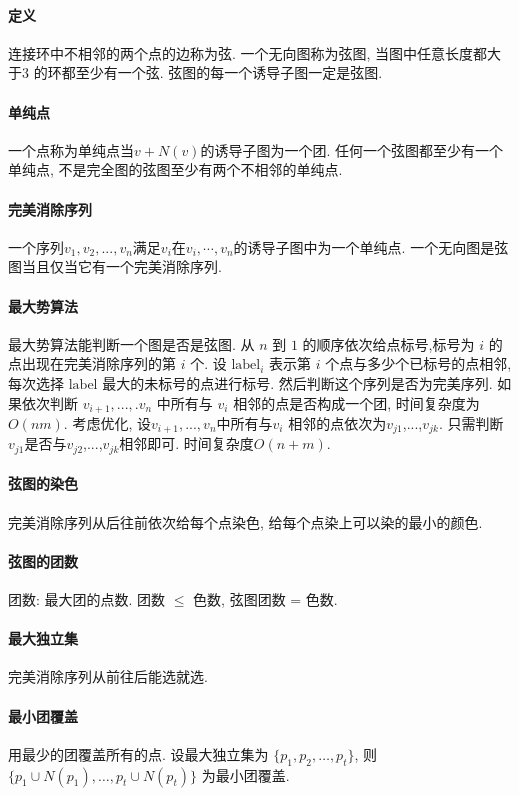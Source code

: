 \paragraph{定义}连接环中不相邻的两个点的边称为弦. 一个无向图称为弦图, 当图中任意长度都大于$3$ 的环都至少有一个弦. 弦图的每一个诱导子图一定是弦图. 
\paragraph{单纯点}一个点称为单纯点当${v}+N(v)$的诱导子图为一个团. 任何一个弦图都至少有一个单纯点, 不是完全图的弦图至少有两个不相邻的单纯点. 
\paragraph{完美消除序列}一个序列${v_1,v_2,...,v_n}$满足$v_i$在${v_i,\cdots,v_n}$的诱导子图中为一个单纯点. 一个无向图是弦图当且仅当它有一个完美消除序列.
\paragraph{最大势算法}最大势算法能判断一个图是否是弦图. 从 $n$ 到 $1$ 的顺序依次给点标号,标号为 $i$ 的点出现在完美消除序列的第 $i$ 个.
设 $\mathrm{label}_i$ 表示第 $i$ 个点与多少个已标号的点相邻, 每次选择 $\mathrm{label}$ 最大的未标号的点进行标号. 
然后判断这个序列是否为完美序列. 如果依次判断 ${v_{i+1},...,.v_n}$ 中所有与 $v_i$ 相邻的点是否构成一个团, 时间复杂度为 $O(nm)$.
考虑优化, 设${v_{i+1},...,v_n}$中所有与$v_i$ 相邻的点依次为$v_{j1}$,...,$v_{jk}$. 
只需判断$v_{j1}$是否与$v_{j2}$,...,$v_{jk}$相邻即可. 时间复杂度$O(n+m)$. 
\paragraph{弦图的染色} 完美消除序列从后往前依次给每个点染色, 给每个点染上可以染的最小的颜色.
\paragraph{弦图的团数} 团数: 最大团的点数. 团数 $\leq$ 色数, 弦图团数 = 色数.  
\paragraph{最大独立集} 完美消除序列从前往后能选就选.
\paragraph{最小团覆盖} 用最少的团覆盖所有的点. 设最大独立集为 $\{p_1,p_2, \dots ,p_t\}$, 
则 $\{p_1\cup N(p_1), \dots , p_t \cup N(p_t)\}$ 为最小团覆盖.
